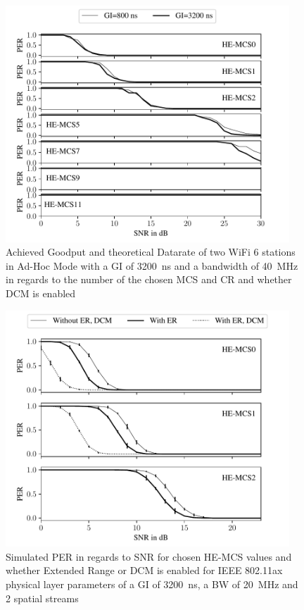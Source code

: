 \begin{figure}%
	\centering
	\includegraphics[width=0.95\textwidth]{figures/GI_PER_to_SNR.pdf}
	\caption{Achieved Goodput and theoretical Datarate of two WiFi 6 stations in Ad-Hoc Mode with a \ac{GI} of \SI{3200}{\nano\second} and a bandwidth of \SI{40}{\mega\hertz} in regards to the number of the chosen \ac{MCS} and \ac{CR} and whether \ac{DCM} is enabled}%
	\label{fig:PER_SNR_GI}%
\end{figure}

\begin{figure}%
	\centering
	\includegraphics[width=0.95\textwidth]{figures/ER_PER_to_SNR.pdf}
	\caption{Simulated \ac{PER} in regards to \ac{SNR} for chosen HE-\ac{MCS} values and whether Extended Range or \ac{DCM}
	is enabled for IEEE 802.11ax physical layer parameters of a \ac{GI} of \SI{3200}{\nano\second}, a \ac{BW} of \SI{20}{\mega\hertz} and 2 spatial streams}
	\label{fig:PER_SNR_ER}%
\end{figure}

